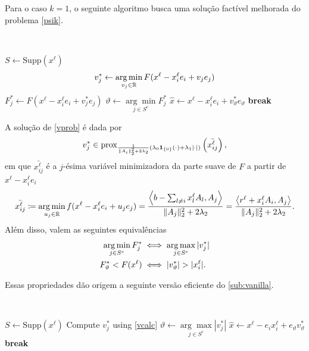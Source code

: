Para o caso $k=1$, o seguinte algoritmo busca uma solução factível melhorada do problema \eqref{psik}.

\begin{algorithm}[H]
\caption{Search for improved solution of problem \eqref{psik} with $k=1$}
\label{sub:vanilla}
\\
\begin{algorithmic}[1]
    \State $S \gets \text{Supp}(x^{\ell})$
            \State \begin{equation}
            v_j^* \gets \operatorname*{arg\,min}_{v_j \in \mathbb{R}} F(x^{\ell} - x_i^{\ell}e_i  + v_je_j )\label{vprob}
            \end{equation}
            \State $F_j^* \gets F(x^{\ell} - x_i^{\ell}e_i +  v_j^*e_j)$ 
        \EndFor
        \State $\vartheta \gets \underset{j \in S^c}{\arg\min} F_j^*$ 
            \State $\hat{x} \gets x^{\ell} - x_i^{\ell}e_i +  v_\vartheta^*e_\vartheta$ 
            \State \textbf{break}
        \EndIf
    \EndFor
\end{algorithmic}
\end{algorithm}

A solução de \eqref{vprob} é dada por
\begin{equation}
    v_j^*\in \operatorname{prox}_{\frac{1}{\|A_i\|^2_2+2\lambda_2}(\lambda_0\mathbf{1}_{\{0\}}(\cdot)+\lambda_1|\cdot|)}\left(\bar{x_{ij}^\ell}\right),\label{vcalc}
\end{equation}
em que $\bar{x_{ij}^\ell}$ é a $j$-ésima variável minimizadora da parte suave de $F$ a partir de $x^\ell-x_i^\ell e_i$
\[\bar{x_{ij}^\ell}\coloneq\operatorname*{arg\,min}_{u_j\in\mathbb{R}}f(x^\ell-x_i^\ell e_i+u_je_j)=\frac{\left\langle b-\sum_{l\neq i}x^\ell_lA_l,A_j \right\rangle}{\|A_j\|^2_2+2\lambda_2}=\frac{\left\langle r^\ell+x_i^\ell A_i,A_j \right\rangle}{\|A_j\|^2_2+2\lambda_2}.\]
Além disso, valem as seguintes equivalências
\begin{align*}
\operatorname*{arg\,min}_{j \in S^c} F_j^* &\iff \operatorname*{arg\,max}_{j \in S^c} |v_j^*|  \\
F_\vartheta^* < F(x^\ell) &\iff |v_\vartheta^*| > |x_i^\ell|. 
\end{align*}

Essas propriedades dão origem a seguinte versão eficiente do \autoref{sub:vanilla}.

\begin{algorithm}[H]
\caption{Efficient search for improved solution of problem \eqref{psik} with $k=1$}
\label{sub:eff}
\\
\begin{algorithmic}[1]
    \State $S \gets \text{Supp}(x^{\ell})$
            \State Compute $v_j^*$ using \eqref{vcalc}
        \EndFor
        \State $\vartheta \gets \underset{j \in S^c}{\arg\max} |v_j^*|$
            \State $\hat{x} \gets x^{\ell} - e_i x_i^{\ell} + e_{\vartheta} v_{\vartheta}^*$
            \State \textbf{break}
        \EndIf
    \EndFor
\end{algorithmic}
\end{algorithm}